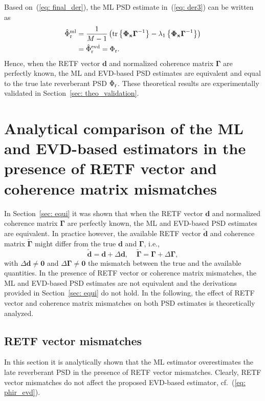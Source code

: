 \documentclass[10pt]{IEEEtran}
\begin{document}
Based on~(\ref{eq: final_der}), the ML PSD estimate in~(\ref{eq: der3}) can be written as
\begin{align}
\label{eq: der6}
\hat{\Phi}_{\rm r}^{\rm ml} &= \frac{1}{M-1} \left( {\rm tr} \left\{  \mathbf{\Phi}_{\mathbf{x}}\boldsymbol{\Gamma}^{-1} \right\} - \lambda_1 \left\{ \mathbf{\Phi}_{\mathbf{x}}\boldsymbol{\Gamma}^{-1}\right\} \right) \\
\label{eq: der7}
& = \hat{\Phi}_{\rm r}^{\rm evd} = \Phi_{\rm r}.
\end{align}
Hence, when the RETF vector $\mathbf{d}$ and normalized coherence matrix $\boldsymbol{\Gamma}$ are perfectly known, the ML and EVD-based PSD estimates are equivalent and equal to the true late reverberant PSD ${\Phi}_{\rm r}$.
These theoretical results are experimentally validated in Section~\ref{sec: theo_validation}.


\section{Analytical comparison of the ML and EVD-based estimators in the presence of RETF vector and coherence matrix mismatches}
\label{sec: non_equi}
In Section~\ref{sec: equi} it was shown that when the RETF vector $\mathbf{d}$ and normalized coherence matrix $\boldsymbol{\Gamma}$ are perfectly known, the ML and EVD-based PSD estimates are equivalent.
In practice however, the available RETF vector $\tilde{\mathbf{d}}$ and coherence matrix $\tilde{\boldsymbol{\Gamma}}$ might differ from the true $\mathbf{d}$ and $\boldsymbol{\Gamma}$, i.e.,
\begin{equation}
\label{eq: mis}
\tilde{\mathbf{d}} = \mathbf{d} + \Delta\mathbf{d}, \; \; \; \; \tilde{\boldsymbol{\Gamma}} = \boldsymbol{\Gamma} + \Delta\boldsymbol{\Gamma},
\end{equation}
with $\Delta\mathbf{d} \neq \mathbf{0}$ and $\Delta\boldsymbol{\Gamma} \neq \mathbf{0}$ the mismatch between the true and the available quantities.
In the presence of RETF vector or coherence matrix mismatches, the ML and EVD-based PSD estimates are not equivalent and the derivations provided in Section~\ref{sec: equi} do not hold. 
In the following, the effect of RETF vector and coherence matrix mismatches on both PSD estimates is theoretically analyzed.

\subsection{RETF vector mismatches}
In this section it is analytically shown that the ML estimator overestimates the late reverberant PSD in the presence of RETF vector mismatches.
Clearly, RETF vector mismatches do not affect the proposed EVD-based estimator, cf.~(\ref{eq: phir_evd}).
\end{document}
